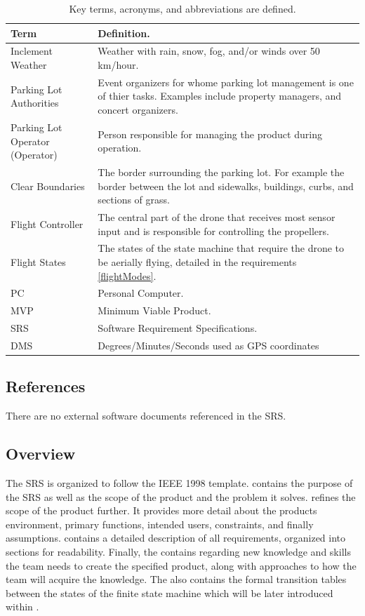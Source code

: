 \documentclass{article}
\begin{document}
\begin{table}[!h]
\begin{center}
\caption {Key terms, acronyms, and abbreviations are defined.} 
\label{DefTable}
\begin{tabular}{ | m{3cm} | m{11cm} | }
\hline
Term & Definition. \\
\hline
Inclement Weather & Weather with rain, snow, fog, and/or winds over 50 km/hour. \\
\hline
Parking Lot Authorities & Event organizers for whome parking lot management is one of thier tasks. Examples include property managers, and concert organizers.  \\
\hline
Parking Lot Operator (Operator) & Person responsible for managing the product during operation. \\
\hline
Clear Boundaries & The border surrounding the parking lot. For example the border between the lot and sidewalks, buildings, curbs, and sections of grass.\\
\hline
Flight Controller & The central part of the drone that receives most sensor input and is responsible for controlling the propellers.\\
\hline
Flight States & The states of the state machine that require the drone to be aerially flying, detailed in the requirements \ref{flightModes}.\\
\hline
PC & Personal Computer. \\
\hline
MVP & Minimum Viable Product. \\
\hline
SRS & Software Requirement Specifications. \\
\hline
DMS & Degrees/Minutes/Seconds used as GPS coordinates\\
\hline
\end{tabular}
\end{center}
\end{table}

\subsection{References}
There are no external software documents referenced in the SRS. 

\subsection{Overview}
The SRS is organized to follow the IEEE 1998 template.  contains the purpose of the SRS as well as the scope of the product and the problem it solves.   refines the scope of the product further. It provides more detail about the products environment, primary functions, intended users, constraints, and finally assumptions.  contains a detailed description of all requirements, organized into sections for readability. Finally, the  contains  regarding new knowledge and skills the team needs to create the specified product, along with approaches to how the team will acquire the knowledge. The   also contains the formal transition tables between the states of the finite state machine which will be later introduced within .
\end{document}
